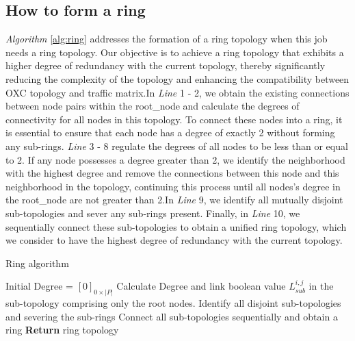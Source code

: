 \documentclass[conference]{IEEEtran}
\begin{document}
\subsection{How to form a ring}


\emph{Algorithm} \ref{alg:ring} addresses the formation of a ring topology when this job needs a ring topology. Our objective is to achieve a ring topology that exhibits a higher degree of redundancy with the current topology, thereby significantly reducing the complexity of the topology and enhancing the compatibility between OXC topology and traffic matrix.In \emph{Line} 1 - 2, we obtain the existing connections between node pairs within the root\_node and calculate the degrees of connectivity for all nodes in this topology. To connect these nodes into a ring, it is essential to ensure that each node has a degree of exactly 2 without forming any sub-rings. \emph{Line} 3 - 8 regulate the degrees of all nodes to be less than or equal to 2. If any node possesses a degree greater than 2, we identify the neighborhood with the highest degree and remove the connections between this node and this neighborhood in the topology, continuing this process until all nodes's degree in the root\_node are not greater than 2.In \emph{Line} 9, we identify all mutually disjoint sub-topologies and sever any sub-rings present. Finally, in \emph{Line} 10, we sequentially connect these sub-topologies to obtain a unified ring topology, which we consider to have the highest degree of redundancy with the current topology.

\begin{algorithm}
	\caption{Ring algorithm}
	\label{alg:ring}
	\LinesNumbered
	Initial Degree = $[0]_{0\times|P|}$\;
	Calculate Degree and link boolean value $L_{sub}^{i,j}$ in the sub-topology comprising only the root nodes.\;
	Identify all disjoint sub-topologies and severing the sub-rings\;
	Connect all sub-topologies sequentially and obtain a ring\;
	\textbf{Return} ring topology\;
\end{algorithm}
\end{document}
